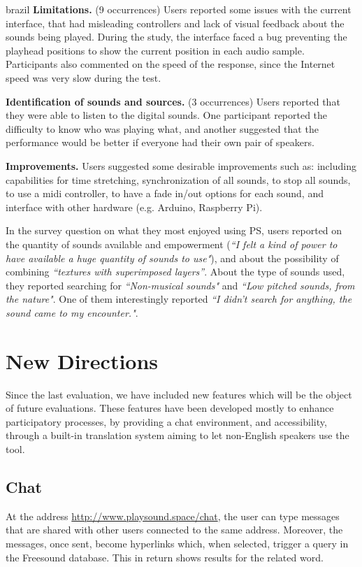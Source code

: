 \begin{otherlanguage*}{brazil}
\textbf{Limitations.} (9 occurrences) Users reported some issues with the current interface, that had misleading controllers and lack of visual feedback about the sounds being played. During the study, the interface faced a bug preventing the playhead positions to show the current position in each audio sample. Participants also commented on the speed of the response, since the Internet speed was very slow during the test.

\textbf{Identification of sounds and sources.} (3 occurrences) Users reported that they were able to listen to the digital sounds. One participant reported the difficulty to know who was playing what, and another suggested that the performance would be better if everyone had their own pair of speakers.

\textbf{Improvements.} Users suggested some desirable improvements such as: including capabilities for time stretching, synchronization of all sounds, to stop all sounds, to use a midi controller, to have a fade in/out options for each sound, and interface with other hardware (e.g. Arduino, Raspberry Pi).

In the survey question on what they most enjoyed using PS, users reported on the quantity of sounds available and empowerment (\textit{``I felt a kind of power to have available a huge quantity of sounds to use"}), and about the possibility of combining \textit{``textures with superimposed layers''}. About the type of sounds used, they reported searching for \textit{``Non-musical sounds"} and \textit{``Low pitched sounds, from the nature"}. One of them interestingly reported \textit{``I didn't search for anything, the sound came to my encounter."}.

\section{New Directions}

Since the last evaluation, we have included new features which will be the object of future evaluations. These features have been developed mostly to enhance participatory processes, by providing a chat environment, and accessibility, through a built-in translation system aiming to let non-English speakers use the tool.

\subsection{Chat}
At the address \url{http://www.playsound.space/chat}, the user can type messages that are shared with other users connected to the same address. Moreover, the messages, once sent, become hyperlinks which, when selected, trigger a query in the Freesound database. This in return shows results for the related word. 


\end{otherlanguage*}
